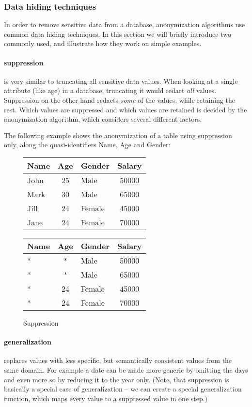\subsubsection{Data hiding techniques} In order to remove sensitive data from a database, anonymization algorithms use common data hiding techniques. In this section we will briefly introduce two commonly used, and illustrate how they work on simple examples.

\paragraph{suppression} is very similar to truncating all sensitive data values. When looking at a single attribute (like age) in a database, truncating it would redact \textit{all} values. Suppression on the other hand redacts \textit{some} of the values, while retaining the rest. \cite{aggarwal} Which values are suppressed and which values are retained is decided by the anonymization algorithm, which considers several different factors.

The following example shows the anonymization of a table using suppression only, along the quasi-identifiers Name, Age and Gender:

\begin{figure}[H]
	\centering
	\begin{tabular}{|l|c|l|c|}
		\hline
		\textbf{Name} & \textbf{Age} & \textbf{Gender} & \textbf{Salary} \\
		\hline
		John & 25 & Male   & 50000 \\
		Mark & 30 & Male   & 65000 \\
		Jill & 24 & Female & 45000 \\
		Jane & 24 & Female & 70000 \\
		\hline
	\end{tabular}
	\quad
	\begin{tabular}{|l|c|l|c|}
		\hline
		\textbf{Name} & \textbf{Age} & \textbf{Gender} & \textbf{Salary} \\
		\hline
		* & *  & Male   & 50000 \\
		* & *  & Male   & 65000 \\
		* & 24 & Female & 45000 \\
		* & 24 & Female & 70000 \\
		\hline
	\end{tabular}
	\caption{Suppression}
	\label{fig:suppression1}
\end{figure}

\paragraph{generalization} replaces values with less specific, but semantically consistent values from the same domain. For example a date can be made more generic by omitting the days and even more so by reducing it to the year only. (Note, that suppression is basically a special case of generalization -- we can create a special generalization function, which maps every value to a suppressed value in one step.)

